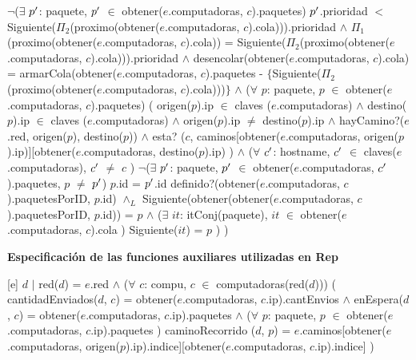 \begin{Representacion}
{	$\neg$($\exists$ $p\sp{\prime}$: paquete, $p\sp{\prime}$ $\in$ obtener($e$.computadoras, $c$).paquetes) $p\sp{\prime}$.prioridad $<$ Siguiente($\Pi_2$(proximo(obtener($e$.computadoras, $c$).cola))).prioridad $\wedge$ \newline
	$\Pi_1$(proximo(obtener($e$.computadoras, $c$).cola)) = Siguiente($\Pi_2$(proximo(obtener($e$.computadoras, $c$).cola))).prioridad $\wedge$ \newline
	desencolar(obtener($e$.computadoras, $c$).cola) = armarCola(obtener($e$.computadoras, $c$).paquetes - $\{$Siguiente($\Pi_2$(proximo(obtener($e$.computadoras, $c$).cola)))$\}$ $\wedge$
	\newline
	($\forall$ $p$: paquete, $p$ $\in$ obtener($e$.computadoras, $c$).paquetes) (
	 origen($p$).ip $\in$ claves ($e$.computadoras) $\wedge$ 
destino($p$).ip $\in$ claves ($e$.computadoras) $\wedge$ 
	 origen($p$).ip $\neq$ destino($p$).ip $\wedge$ 
	 hayCamino?($e$.red, origen($p$), destino($p$)) $\wedge$ 
	 esta? ($c$, caminos[obtener($e$.computadoras, origen($p$).ip)][obtener($e$.computadoras, destino($p$).ip) ) $\wedge$
	 ($\forall$ $c\sp{\prime}$: hostname, $c\sp{\prime}$ $\in$ claves($e$.computadoras), $c\sp{\prime}$ $\neq$ $c$ )  $\neg$($\exists$ $p\sp{\prime}$: paquete, $p\sp{\prime}$ $\in$ obtener($e$.computadoras, $c\sp{\prime}$).paquetes, $p$ $\neq$ $p\sp{\prime}$) $p$.id = $p\sp{\prime}$.id 
	definido?(obtener($e$.computadoras, $c$).paquetesPorID, $p$.id) $\wedge_L$ \newline
	Siguiente(obtener(obtener($e$.computadoras, $c$).paquetesPorID,  $p$.id)) = $p$  $\wedge$ 
	 ($\exists$ $it$: itConj(paquete), $it$ $\in$ obtener($e$.computadoras, $c$).cola ) 
	Siguiente($it$) = $p$  ) )
}

\textbf{}

\textbf{Especificaci\'on de las funciones auxiliares utilizadas en Rep}





\textbf{}

[e]{ $d$ $|$ 
red($d$) = $e$.red $\wedge$ \newline
($\forall$ $c$: compu, $c$ $\in$ computadoras(red($d$))) ( \newline
cantidadEnviados($d$, $c$) = obtener($e$.computadoras, $c$.ip).cantEnvios $\wedge$ \newline
enEspera($d$, $c$) = obtener($e$.computadoras, $c$.ip).paquetes $\wedge$ \newline
($\forall$ $p$: paquete, $p$ $\in$  obtener($e$.computadoras, $c$.ip).paquetes ) 
caminoRecorrido ($d$, $p$) = $e$.caminos[obtener($e$.computadoras, origen($p$).ip).indice][obtener($e$.computadoras, $c$.ip).indice] ) 
}


\end{Representacion}
